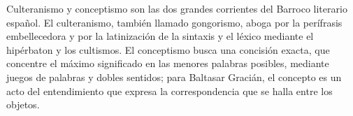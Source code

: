 \documentclass{book}
\begin{document}
\begin{tcolorbox}[title={Definición}, studiumdef, breakable]

Culteranismo y conceptismo son las dos grandes corrientes del Barroco literario español. El culteranismo, también llamado gongorismo, aboga por la perífrasis embellecedora y por la latinización de la sintaxis y el léxico mediante el hipérbaton y los cultismos. El conceptismo busca una concisión exacta, que concentre el máximo significado en las menores palabras posibles, mediante juegos de palabras y dobles sentidos; para Baltasar Gracián, el concepto es un acto del entendimiento que expresa la correspondencia que se halla entre los objetos.

\end{tcolorbox}
\end{document}
